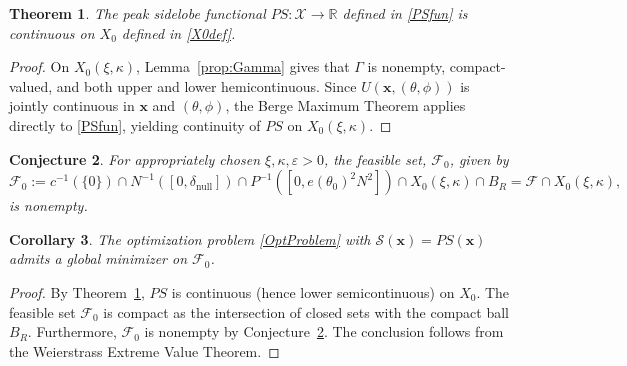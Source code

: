 \documentclass[11pt,letterpaper]{article}
\theoremstyle{definition}
\theoremstyle{plain}
\newtheorem{theorem}{Theorem}[section]
\newtheorem{corollary}[theorem]{Corollary}
\newtheorem{conjecture}[theorem]{Conjecture}
\begin{document}
\begin{theorem}
\label{thm:PS_continuity}
The peak sidelobe functional $PS : \mathcal{X} \to \mathbb{R}$ defined in \eqref{PSfun} is continuous on $X_0$ defined in \eqref{X0def}.
\end{theorem}

\begin{proof}
On $X_0(\xi, \kappa) $, Lemma~\ref{prop:Gamma} gives that $\Gamma$ is nonempty, compact-valued, and both upper and lower hemicontinuous. Since $U(\mathbf{x}, (\theta, \phi))$ is jointly continuous in $\mathbf{x}$ and $(\theta, \phi)$, the Berge Maximum Theorem applies directly to \eqref{PSfun}, yielding continuity of $PS$ on $X_0(\xi, \kappa)$.
\end{proof}


\begin{conjecture} For appropriately chosen $\xi, \kappa, \varepsilon>0$, the feasible set, $\mathcal{F}_0$, given by 
    \begin{equation}
\mathcal{F}_0 := c^{-1}(\{0\}) \cap N^{-1}([0, \delta_{\mathrm{null}}])\cap P^{-1}([0, e(\theta_0)^2N^2]) \cap X_0(\xi, \kappa) \cap B_R = \mathcal{F}\cap X_0(\xi, \kappa),
\label{F0}
\end{equation}
is nonempty.
\label{F0_nonempty_proof}
\end{conjecture}

\begin{corollary}
The optimization problem \eqref{OptProblem} with $\mathcal{S}(\mathbf{x}) = PS(\mathbf{x})$ admits a global minimizer on $\mathcal{F}_0$.
\end{corollary}

\begin{proof}
By Theorem~\ref{thm:PS_continuity}, $PS$ is continuous (hence lower semicontinuous) on $X_0$. The feasible set $\mathcal{F}_0$ is compact as the intersection of closed sets with the compact ball $B_R$. Furthermore, $\mathcal{F}_0$ is nonempty by Conjecture~\ref{F0_nonempty_proof}. The conclusion follows from the Weierstrass Extreme Value Theorem.
\end{proof}



\end{document}
